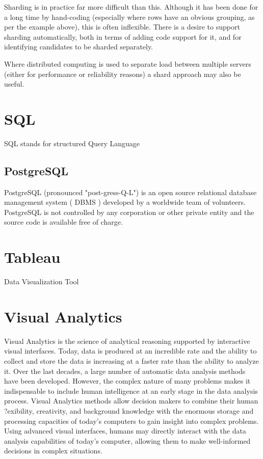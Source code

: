 \documentclass[11pt]{article} %
\begin{document}
Sharding is in practice far more difficult than this. Although it has been done for a long time by hand-coding (especially where rows have an obvious grouping, as per the example above), this is often inflexible. There is a desire to support sharding automatically, both in terms of adding code support for it, and for identifying candidates to be sharded separately.

Where distributed computing is used to separate load between multiple servers (either for performance or reliability reasons) a shard approach may also be useful.


\section{SQL}
SQL stands for structured Query Language
\subsection{PostgreSQL}
PostgreSQL (pronounced "post-gress-Q-L") is an open source relational database management system ( DBMS ) developed by a worldwide team of volunteers. PostgreSQL is not controlled by any corporation or other private entity and the source code is available free of charge.

\newpage
\section{Tableau}
Data Visualization Tool


\section{Visual Analytics}
Visual Analytics is the science of analytical reasoning supported by interactive visual interfaces. Today, data is produced at an incredible rate and the ability to collect and store the data is increasing at a faster rate than the ability to analyze it. Over the last decades, a large number of automatic data analysis methods have been developed. However, the complex nature of many problems makes it indispensable to include human intelligence at an early stage in the data analysis process. Visual Analytics methods allow decision makers to combine their human ?exibility, creativity, and background knowledge with the enormous storage and processing capacities of today’s computers to gain insight into complex problems. Using advanced visual interfaces, humans may directly interact with the data analysis capabilities of today’s computer, allowing them to make well-informed decisions in complex situations.
\newpage
\end{document}
